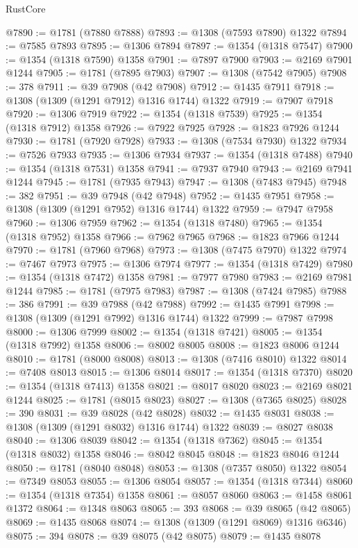 \begin{lexlean}{RustCore}
\begin{coremodule}
@7890 := @1781 (@7880 @7888)
@7893 := @1308 (@7593 @7890) @1322
@7894 := @7585 @7893
@7895 := @1306 @7894
@7897 := @1354 (@1318 @7547)
@7900 := @1354 (@1318 @7590) @1358
@7901 := @7897 @7900
@7903 := @2169 @7901 @1244
@7905 := @1781 (@7895 @7903)
@7907 := @1308 (@7542 @7905)
@7908 := 378
@7911 := @39 @7908 (@42 @7908)
@7912 := @1435 @7911
@7918 := @1308 (@1309 (@1291 @7912) @1316 @1744) @1322
@7919 := @7907 @7918
@7920 := @1306 @7919
@7922 := @1354 (@1318 @7539)
@7925 := @1354 (@1318 @7912) @1358
@7926 := @7922 @7925
@7928 := @1823 @7926 @1244
@7930 := @1781 (@7920 @7928)
@7933 := @1308 (@7534 @7930) @1322
@7934 := @7526 @7933
@7935 := @1306 @7934
@7937 := @1354 (@1318 @7488)
@7940 := @1354 (@1318 @7531) @1358
@7941 := @7937 @7940
@7943 := @2169 @7941 @1244
@7945 := @1781 (@7935 @7943)
@7947 := @1308 (@7483 @7945)
@7948 := 382
@7951 := @39 @7948 (@42 @7948)
@7952 := @1435 @7951
@7958 := @1308 (@1309 (@1291 @7952) @1316 @1744) @1322
@7959 := @7947 @7958
@7960 := @1306 @7959
@7962 := @1354 (@1318 @7480)
@7965 := @1354 (@1318 @7952) @1358
@7966 := @7962 @7965
@7968 := @1823 @7966 @1244
@7970 := @1781 (@7960 @7968)
@7973 := @1308 (@7475 @7970) @1322
@7974 := @7467 @7973
@7975 := @1306 @7974
@7977 := @1354 (@1318 @7429)
@7980 := @1354 (@1318 @7472) @1358
@7981 := @7977 @7980
@7983 := @2169 @7981 @1244
@7985 := @1781 (@7975 @7983)
@7987 := @1308 (@7424 @7985)
@7988 := 386
@7991 := @39 @7988 (@42 @7988)
@7992 := @1435 @7991
@7998 := @1308 (@1309 (@1291 @7992) @1316 @1744) @1322
@7999 := @7987 @7998
@8000 := @1306 @7999
@8002 := @1354 (@1318 @7421)
@8005 := @1354 (@1318 @7992) @1358
@8006 := @8002 @8005
@8008 := @1823 @8006 @1244
@8010 := @1781 (@8000 @8008)
@8013 := @1308 (@7416 @8010) @1322
@8014 := @7408 @8013
@8015 := @1306 @8014
@8017 := @1354 (@1318 @7370)
@8020 := @1354 (@1318 @7413) @1358
@8021 := @8017 @8020
@8023 := @2169 @8021 @1244
@8025 := @1781 (@8015 @8023)
@8027 := @1308 (@7365 @8025)
@8028 := 390
@8031 := @39 @8028 (@42 @8028)
@8032 := @1435 @8031
@8038 := @1308 (@1309 (@1291 @8032) @1316 @1744) @1322
@8039 := @8027 @8038
@8040 := @1306 @8039
@8042 := @1354 (@1318 @7362)
@8045 := @1354 (@1318 @8032) @1358
@8046 := @8042 @8045
@8048 := @1823 @8046 @1244
@8050 := @1781 (@8040 @8048)
@8053 := @1308 (@7357 @8050) @1322
@8054 := @7349 @8053
@8055 := @1306 @8054
@8057 := @1354 (@1318 @7344)
@8060 := @1354 (@1318 @7354) @1358
@8061 := @8057 @8060
@8063 := @1458 @8061 @1372
@8064 := @1348 @8063
@8065 := 393
@8068 := @39 @8065 (@42 @8065)
@8069 := @1435 @8068
@8074 := @1308 (@1309 (@1291 @8069) @1316 @6346)
@8075 := 394
@8078 := @39 @8075 (@42 @8075)
@8079 := @1435 @8078

\end{coremodule}
\end{lexlean}
